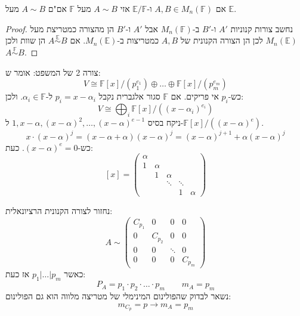 \documentclass{tstextbook}
\begin{document}
\begin{theorem}
אם \(A,B\in M_{n}(\mathbb{F})\) ו-\(\mathbb{E / F}\) אזי \(A \sim B\) מעל \(\mathbb{F}\) אם"ם \(A\sim B\) מעל \(\mathbb{E}\).

\end{theorem}
\begin{proof}
נחשב צורות קנוניות \(A'\) ו-\(B'\) ב-\(M_{n}(\mathbb{F})\) אבל \(A'\) ו-\(B'\) הן מהצורה כמטריצת מעל \(M_{n}(\mathbb{E})\) לכן הן הצורה הקנונית של \(A,B\) כמטריצות ב-\(M_{n}(\mathbb{E})\). אם \(A\overset{\mathbb{E}}{\sim}B\) הן שוות ולכן \(A\overset{\mathbb{F}}{\sim}B\).

\end{proof}
צורה 2 של המשפט:
אומר ש:
$$V\cong  \mathbb{F} [x] / (p_1^{e_{1}})\oplus \dots \oplus \mathbb{F} [x] / (p_{m}^{e_{m}})$$
כש-\(p_{i}\) אי פריקים. אם \(\mathbb{F}\) סגור אלגברית נקבל \(p_{i}=x-\alpha_{i}\) ל-\(\alpha_{i}\in \mathbb{F}\). ולכן:
$$V\cong  \bigoplus_{i} \mathbb{F} [x] / ((x-\alpha_{i})^{e_{i}})$$
ניקח בסיס \(1,x-\alpha,(x-\alpha)^{2},\dots,(x-\alpha)^{e-1}\) ל-\(\mathbb{F}[x] / ((x-\alpha)^{e})\).
$$x\cdot(x-\alpha)^{j}=(x-\alpha+\alpha)(x-\alpha )^{j}=(x-\alpha)^{j+1}+\alpha(x-\alpha)^{j}$$
כש-\((x-\alpha)^{e}=0\). כעת:
$$[x]=\begin{pmatrix}\alpha &  &  &   &   \\1 & \alpha &  &  &    \\ & 1 & \alpha &  &    \\ &  & \ddots & \ddots  &  \\ &  &  & 1 & \alpha  
\end{pmatrix}$$

נחזור לצורה הקנונית הרציונאלית:
$$A\sim  \begin{pmatrix}C_{p_{1}} & 0 & 0 & 0 \\0 & C_{p_{2}} & 0 & 0 \\0 & 0 & \ddots & 0 \\0 & 0 & 0 & C_{p_{m}}
\end{pmatrix}$$
כאשר \(p_{1}|\dots | p_{m}\) אז כעת:
$$P_{A}=p_{1}\cdot p_{2} \cdot \dots \cdot p_{m}\qquad m_{A}=p_{m}$$
נשאר לבדוק שהפולינום המינימלי של מטריצה מלווה הוא גם הפולינום:
$$m_{C_{p}}=p\to m_{A}=p_{m}$$
\end{document}
